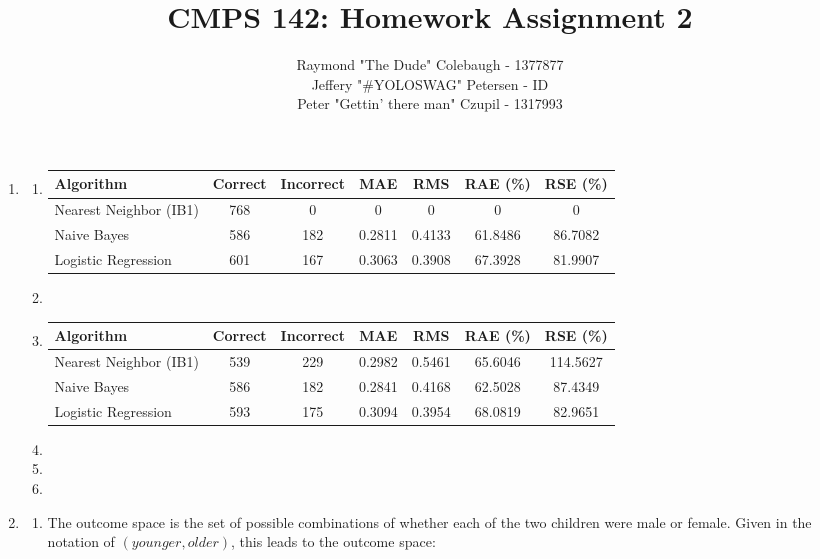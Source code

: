 \documentclass{article}
\title{CMPS 142: Homework Assignment 2}
\author{Raymond "The Dude" Colebaugh - 1377877\\Jeffery "\#YOLOSWAG" Petersen - ID\\Peter "Gettin' there man" Czupil - 1317993}
\begin{document}
\maketitle
\begin{enumerate}
        \item 
            \begin{enumerate}
                \item
                    \begin{tabular}{l | c c c c c c}
                        Algorithm      & Correct & Incorrect & MAE & RMS & RAE (\%) & RSE (\%)\\
                        \hline
                        Nearest Neighbor (IB1) & 768 & 0   & 0      & 0      & 0 & 0 \\
                        Naive Bayes            & 586 & 182 & 0.2811 & 0.4133 & 61.8486 & 86.7082 \\
                        Logistic Regression    & 601 & 167 & 0.3063 & 0.3908 & 67.3928 & 81.9907
                    \end{tabular}
                \item 
                \item
                    \begin{tabular}{l | c c c c c c}
                        Algorithm      & Correct & Incorrect & MAE & RMS & RAE (\%) & RSE (\%)\\
                        \hline
                        Nearest Neighbor (IB1) & 539 & 229 & 0.2982 & 0.5461 & 65.6046 & 114.5627 \\
                        Naive Bayes            & 586 & 182 & 0.2841 & 0.4168 & 62.5028 & 87.4349 \\
                        Logistic Regression    & 593 & 175 & 0.3094 & 0.3954 & 68.0819 & 82.9651
                    \end{tabular}
                \item
                \item
                \item
            \end{enumerate}
        \item
            \begin{enumerate}
                \item The outcome space is the set of possible combinations of whether
                      each of the two children were male or female. Given in the notation
                      of $(younger, older)$, this leads to the outcome space:

\end{enumerate}
\end{enumerate}
\end{document}
